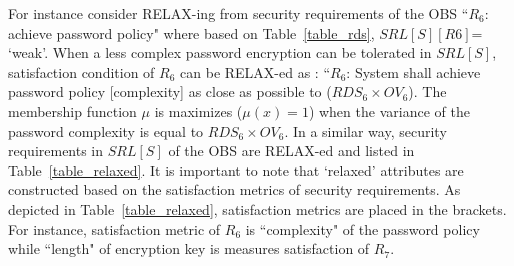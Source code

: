 For instance consider RELAX-ing from security requirements of the OBS ``$R_6$: achieve password policy" where based on Table~\ref{table_rds}, $ SRL[S][R6] $= `weak’. When a less complex password encryption can be tolerated in $ SRL[S] $, satisfaction condition of $R_6$ can be RELAX-ed as : ``$ R_6 $: System shall achieve password policy [complexity] as close as possible to ($ RDS_6 \times OV_6 $). The membership function $\mu$ is maximizes ($\mu(x)=1$) when the variance of the password complexity is equal to $RDS_6 \times OV_6$. In a similar way, security requirements in $ SRL[S] $ of the OBS are RELAX-ed and listed in Table~\ref{table_relaxed}. It is important to note that ‘relaxed’ attributes are constructed based on the satisfaction metrics of security requirements. As depicted in Table~\ref{table_relaxed}, satisfaction metrics are placed in the brackets. For instance, satisfaction metric of $ R_6 $ is ``complexity" of the password policy while ``length" of encryption key is measures satisfaction of $ R_7 $.   

